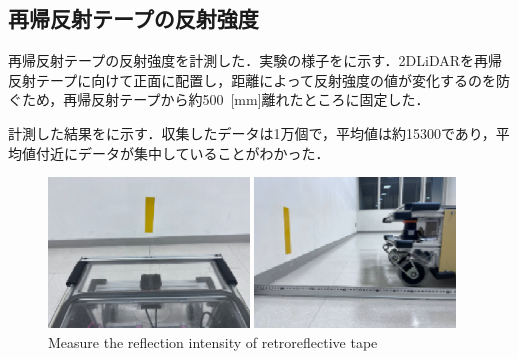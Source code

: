 \newpage

\subsection{再帰反射テープの反射強度}

  再帰反射テープの反射強度を計測した．実験の様子をに示す．2DLiDARを再帰反射テープに向けて正面に配置し，距離によって反射強度の値が変化するのを防ぐため，再帰反射テープから約500 \,[mm]離れたところに固定した．
    
  計測した結果をに示す．収集したデータは1万個で，平均値は約15300であり，平均値付近にデータが集中していることがわかった．

  \begin{figure}[h]
    \centering
    \begin{minipage}[c]{65mm} 
        \centering
        \includegraphics[height=40mm]{images/eps/RobotGuidance_exp2_tape_from_back}
    \end{minipage}
    \begin{minipage}[c]{65mm} 
        \centering
        \includegraphics[height=40mm]{images/eps/RobotGuidance_exp2_tape_from_side}
    \end{minipage}
    \caption{Measure the reflection intensity of retroreflective tape}
    \label{Fig:RobotGuidance_exp2_tape}
  \end{figure}

